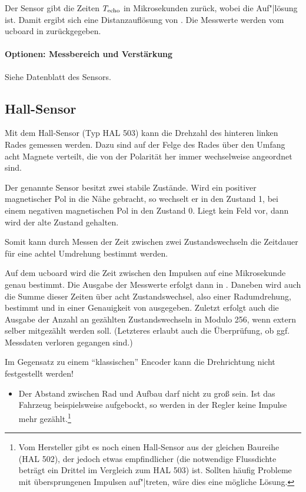 Der Sensor gibt die Zeiten $T_{\mathrm{echo}}$ in Mikrosekunden zurück, wobei die Auf"|lösung  ist. Damit ergibt sich eine Distanzauflösung von \ca {}. Die Messwerte werden vom ucboard in  zurückgegeben.


\paragraph{Optionen: Messbereich und Verstärkung}

Siehe Datenblatt des Sensors.


\subsection{Hall-Sensor}

Mit dem Hall-Sensor (Typ HAL 503) kann die Drehzahl des hinteren linken Rades gemessen werden. Dazu sind auf der Felge des Rades über den Umfang acht Magnete verteilt, die von der Polarität her immer wechselweise angeordnet sind.

Der genannte Sensor besitzt zwei stabile Zustände. Wird ein positiver magnetischer Pol in die Nähe gebracht, so wechselt er in den Zustand 1, bei einem negativen magnetischen Pol in den Zustand 0. Liegt kein Feld vor, dann wird der alte Zustand gehalten. 

Somit kann durch Messen der Zeit zwischen zwei Zustandswechseln die Zeitdauer für eine achtel Umdrehung bestimmt werden. 

Auf dem ucboard wird die Zeit zwischen den Impulsen auf eine Mikrosekunde genau bestimmt. Die Ausgabe der Messwerte erfolgt dann in . Daneben wird auch die Summe dieser Zeiten über acht Zustandswechsel, also einer Radumdrehung, bestimmt und in einer Genauigkeit von  ausgegeben. Zuletzt erfolgt auch die Ausgabe der Anzahl an gezählten Zustandswechseln in Modulo 256, wenn extern selber mitgezählt werden soll. (Letzteres erlaubt auch die Überprüfung, ob ggf. Messdaten verloren gegangen sind.)

Im Gegensatz zu einem "`klassischen"' Encoder kann die Drehrichtung nicht festgestellt werden!

\begin{itemize}
	\item Der Abstand zwischen Rad und Aufbau darf nicht zu groß sein. Ist das Fahrzeug beispielsweise aufgebockt, so werden in der Regler keine Impulse mehr gezählt.\footnote{Vom Hersteller gibt es noch einen Hall-Sensor aus der gleichen Baureihe (HAL 502), der jedoch etwas empfindlicher (die notwendige Flussdichte beträgt \ca ein Drittel im Vergleich zum HAL 503) ist. Sollten häufig Probleme mit übersprungenen Impulsen auf"|treten, wäre dies eine mögliche Lösung.}
\end{itemize}


